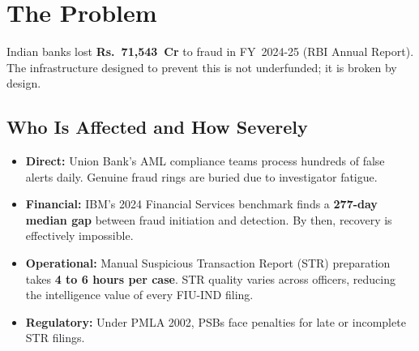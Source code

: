 \documentclass[10pt,a4paper]{article}
\begin{document}
\noindent{}
\thispagestyle{empty}
\vspace{4mm}


\section{The Problem}

\begin{mdframed}[backgroundcolor=tracered!7,linecolor=tracered,linewidth=0.7pt,innerleftmargin=7pt,innerrightmargin=7pt,innertopmargin=4pt,innerbottommargin=4pt]
\small Indian banks lost \textbf{Rs.~71,543~Cr} to fraud in FY~2024-25 (RBI Annual Report). The infrastructure designed to prevent this is not underfunded; it is broken by design.
\end{mdframed}

\subsection{Who Is Affected and How Severely}

\begin{itemize}
  \item \textbf{Direct:} Union Bank's AML compliance teams process hundreds of false alerts daily. Genuine fraud rings are buried due to investigator fatigue.
  \item \textbf{Financial:} IBM's 2024 Financial Services benchmark finds a \textbf{277-day median gap} between fraud initiation and detection. By then, recovery is effectively impossible.
  \item \textbf{Operational:} Manual Suspicious Transaction Report (STR) preparation takes \textbf{4 to 6 hours per case}. STR quality varies across officers, reducing the intelligence value of every FIU-IND filing.
  \item \textbf{Regulatory:} Under PMLA 2002, PSBs face penalties for late or incomplete STR filings.
\end{itemize}
\end{document}
